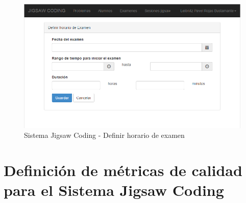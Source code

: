 \begin{enumerate}
	\begin{figure}[h!]
		\centering
		\caption[SJC Sesiones Jigsaw]{Sistema Jigsaw Coding - Definir horario de examen}
		\label{fig:sesionesjigsaw_nuevo_15}
		\includegraphics[scale=0.5]{figuras/usodelsistema/docente/sesionesjigsaw_nuevo_15}
	\end{figure}
\end{enumerate}

\clearpage
\section{Definición de métricas de calidad para el Sistema Jigsaw Coding}





















































